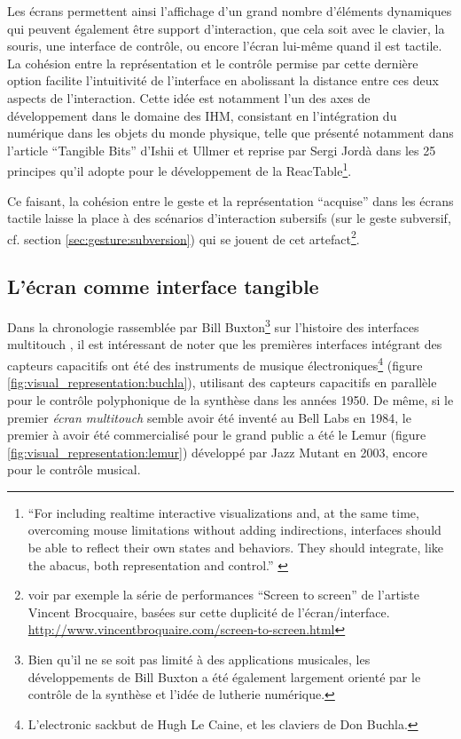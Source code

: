 \indent Les écrans permettent ainsi l'affichage d'un grand nombre d'éléments dynamiques qui peuvent également être support d'interaction, que cela soit avec le clavier, la souris, une interface de contrôle, ou encore l'écran lui-même quand il est tactile. La cohésion entre la représentation et le contrôle permise par cette dernière option facilite l'intuitivité de l'interface en abolissant la distance entre ces deux aspects de l'interaction. Cette idée est notamment l'un des axes de développement dans le domaine des \gls{IHM}, consistant en l'intégration du numérique dans les objets du monde physique, telle que présenté notamment dans l'article ``Tangible Bits'' d'Ishii et Ullmer \cite{ishii_tangible_1997} et reprise par Sergi Jordà dans les 25 principes qu'il adopte pour le développement de la ReacTable\footnote{``For including realtime interactive visualizations and, at the same time, overcoming
mouse limitations without adding indirections, interfaces should be able to reflect their own states and behaviors. They should integrate, like the abacus, both representation and control.'' \cite{jorda_digital_2005}}.

\indent Ce faisant, la cohésion entre le geste et la représentation ``acquise'' dans les écrans tactile laisse la place à des scénarios d'interaction subersifs (sur le geste subversif, cf. section \ref{sec:gesture:subversion}) qui se jouent de cet artefact\footnote{voir par exemple la série de performances ``Screen to screen'' de l'artiste Vincent Brocquaire, basées sur cette duplicité de l'écran/interface. \url{http://www.vincentbroquaire.com/screen-to-screen.html}}. 

\subsection{L'écran comme interface tangible}

\noindent Dans la chronologie rassemblée par Bill Buxton\footnote{Bien qu'il ne se soit pas limité à des applications musicales, les développements de Bill Buxton a été également largement orienté par le contrôle de la synthèse et l'idée de lutherie numérique.} sur l'histoire des interfaces multitouch \cite{buxton_multi-touch_2007}, il est intéressant de noter que les premières interfaces intégrant des capteurs capacitifs ont été des instruments de musique électroniques\footnote{L'electronic sackbut de Hugh Le Caine, et les claviers de Don Buchla.} (figure \ref{fig:visual_representation:buchla}), utilisant des capteurs capacitifs en parallèle pour le contrôle polyphonique de la synthèse dans les années 1950. De même, si le premier \textit{écran multitouch} semble avoir été inventé au Bell Labs en 1984, le premier à avoir été commercialisé pour le grand public a été le Lemur (figure \ref{fig:visual_representation:lemur}) développé par Jazz Mutant en 2003, encore pour le contrôle musical.

